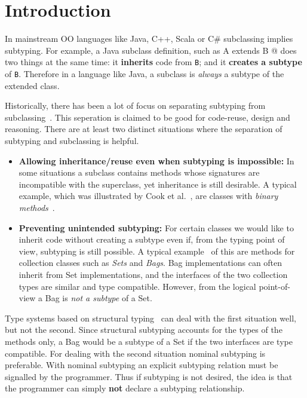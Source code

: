 \saveSpace
\section{Introduction}\label{sec:intro}
\saveSpace
In mainstream OO languages like Java, C++, Scala or C\# subclassing 
implies subtyping. For example, a Java subclass definition, such as 
\Q@class A extends B {}@
\noindent does two things at the same time:
it {\bf inherits} code from \lstinline{B}; and it {\bf creates
a subtype} of \lstinline{B}. Therefore in a language like Java, 
a subclass is \emph{always} a subtype of the extended class.

Historically, there has been a lot of focus on
separating subtyping from subclassing~\cite{cook}.  This seperation is claimed to be
good for code-reuse, design and reasoning. There are at
least two distinct situations where the separation of subtyping and 
subclassing is helpful.

\begin{itemize}

\item {\bf Allowing inheritance/reuse even when subtyping is impossible:} 
In some situations a subclass contains methods whose signatures 
are incompatible with the superclass, yet inheritance is still
desirable. A typical example, which was illustrated by Cook et al.~\cite{cook}, are 
classes with \emph{binary methods}~\cite{bruce96binary}.

\item {\bf Preventing unintended subtyping:} For certain classes we
  would like to inherit code without creating a subtype even if, from
  the typing point of view, subtyping is still possible. A typical
  example~\cite{LaLonde:1991:SSS:110673.110679} of this are methods for collection classes such as \emph{Sets} and
  \emph{Bags}. Bag implementations can often inherit 
  from Set implementations, and the interfaces of the two collection types are
  similar and type compatible. 
  However, from the logical point-of-view a Bag is \emph{not a
    subtype} of a Set. 

\end{itemize}

Type systems based on structural typing~\cite{cook} can deal with the first
situation well, but not the second. Since structural subtyping
accounts for the types of the methods only, a Bag would be a subtype
of a Set if the two interfaces are type compatible. For dealing with
the second situation nominal subtyping is preferable. With nominal
subtyping an explicit subtyping relation must be signalled by the
programmer. Thus if subtyping is not desired, the idea is that the
programmer can simply {\bf not} declare a subtyping relationship.

